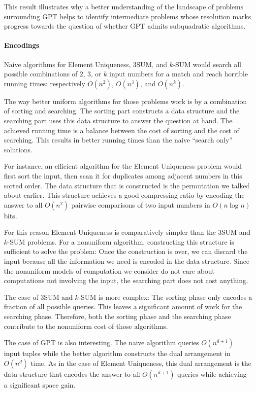 This result illustrates why a better understanding of the landscape of problems
surrounding GPT helps to identify intermediate problems whose resolution marks
progress towards the question of whether GPT admits subquadratic algorithms.

\paragraph{Encodings}
Naive algorithms for Element Uniqueness, 3SUM, and \(k\)-SUM would search
all possible combinations of \(2\), \(3\), or \(k\) input numbers for a match
and reach horrible running times: respectively \(O(n^2)\), \(O(n^3)\), and \(O(n^k)\).

The way better uniform algorithms for those problems work
is by a combination of sorting and searching. The sorting part
constructs a data structure and the searching part uses this data structure to
answer the question at hand. The achieved running time is a balance between the
cost of sorting and the cost of searching. This results in better
running times than the naive ``search only'' solutions.

For instance, an efficient algorithm for the
Element Uniqueness problem would first sort the input, then scan it for
duplicates among adjacent numbers in this sorted order. The data structure that
is constructed is the permutation we talked about earlier. This structure
achieves a good compressing ratio by encoding the answer to all \(O(n^2)\)
pairwise comparisons of two input numbers in \(O(n \log n)\) bits.

For this reason Element Uniqueness is comparatively simpler than the 3SUM and
\(k\)-SUM problems.
For a nonuniform algorithm, constructing this structure is sufficient to solve
the problem: Once the construction is over, we can discard the input because
all the information we need is encoded in the data structure. Since the nonuniform
models of computation we consider do not care about computations not involving
the input, the searching part does not cost anything.

The case of 3SUM and \(k\)-SUM is more complex: The sorting phase only encodes
a fraction of all possible queries. This leaves a significant amount of work
for the searching phase. Therefore, both the sorting phase and the searching
phase contribute to the nonuniform cost of those algorithms.

The case of GPT is also interesting. The naive algorithm queries
\(O(n^{d+1})\) input tuples while the better algorithm constructs the dual
arrangement in \(O(n^d)\) time.
As in the case of Element Uniqueness,
this dual arrangement is the data structure that encodes the answer to all
\(O(n^{d+1})\) queries while achieving a significant space gain.

